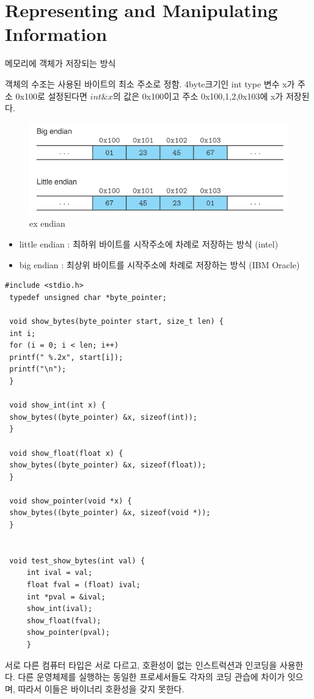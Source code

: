 \chapter{Representing and Manipulating Information}


메모리에 객체가 저장되는 방식

객체의 수조는 사용된 바이트의 최소 주소로 정함.
4byte크기인 int type 변수 x가 주소 0x100로 설정된다면 $int \&x$의 값은 0x100이고 주소 0x100,1,2,0x103에 x가 저장된다.






\begin{figure}[h!]
    \centering
    \includegraphics[scale=0.3]{pic/section12/pic11.png}
    \caption{ex endian}
\end{figure}


\begin{itemize}
    \item little endian :  최하위 바이트를 시작주소에 차례로 저장하는 방식 (intel)
    \item big endian : 최상위 바이트를 시작주소에 차례로 저장하는 방식 (IBM Oracle)
\end{itemize}


\begin{lstlisting}[style = CStyle]
 #include <stdio.h>
 typedef unsigned char *byte_pointer;

 void show_bytes(byte_pointer start, size_t len) {
 int i;
 for (i = 0; i < len; i++)
 printf(" %.2x", start[i]);
 printf("\n");
 }

 void show_int(int x) {
 show_bytes((byte_pointer) &x, sizeof(int));
 }

 void show_float(float x) {
 show_bytes((byte_pointer) &x, sizeof(float));
 }

 void show_pointer(void *x) {
 show_bytes((byte_pointer) &x, sizeof(void *));
 }


 void test_show_bytes(int val) {
     int ival = val;
     float fval = (float) ival;
     int *pval = &ival;
     show_int(ival);
     show_float(fval);
     show_pointer(pval);
     }

\end{lstlisting}
서로 다른 컴퓨터 타입은 서로 다르고, 호환성이 없는 인스트럭션과 인코딩을 사용한다. 다른 운영체제를 실행하는 동일한 프로세서들도 각자의 코딩 관습에 차이가 잇으며, 따라서 이들은 바이너리 호환성을 갖지 못한다.

